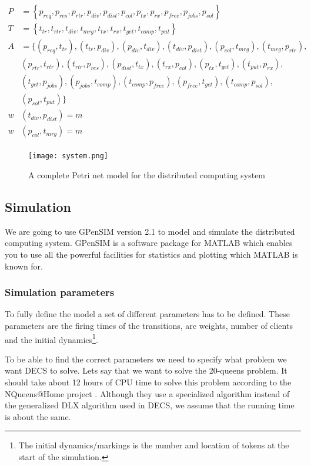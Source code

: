 \begin{align*} 
P &= \left\{p_{req}, p_{res}, p_{rtr}, p_{div}, p_{dist}, p_{col}, p_{tx}, p_{rx}, p_{free}, p_{jobs}, p_{sol}\right\} \\
T &= \left\{t_{tr}, t_{rtr}, t_{div}, t_{mrg}, t_{tx}, t_{rx}, t_{get}, t_{comp}, t_{put}\right\} \\
A &= \{(p_{req}, t_{tr}), (t_{tr}, p_{div}), (p_{div}, t_{div}), (t_{div}, p_{dist}), (p_{col}, t_{mrg}), (t_{mrg}, p_{rtr}), \\
&(p_{rtr}, t_{rtr}), (t_{rtr}, p_{res}), (p_{dist}, t_{tx}), (t_{rx}, p_{col}), (p_{tx}, t_{get}), (t_{put}, p_{rx}), \\
&(t_{get}, p_{jobs}), (p_{jobs}, t_{comp}), (t_{comp}, p_{free}), (p_{free}, t_{get}), (t_{comp}, p_{sol}), \\
&(p_{sol}, t_{put})\} \\
w&(t_{div}, p_{dist}) = m \\
w&(p_{col}, t_{mrg}) = m \\
\end{align*}

\begin{figure}[htbp]
	\centering 
	\texttt{[image: system.png]}
	\caption{A complete Petri net model for the distributed computing system}
	\label{fig:system}
\end{figure}


\subsection{Simulation}

We are going to use GPenSIM \cite{gpensim} version 2.1 to model and simulate the distributed computing system.
GPenSIM is a software package for MATLAB which enables you to use all the powerful facilities for statistics and plotting which MATLAB is known for.


\subsubsection{Simulation parameters}

To fully define the model a set of different parameters has to be defined.
These parameters are the firing times of the transitions, arc weights, number of clients and the initial dynamics\footnote{The initial dynamics/markings is the number and location of tokens at the start of the simulation.}.

To be able to find the correct parameters we need to specify what problem we want DECS to solve.
Lets say that we want to solve the 20-queens problem.
It should take about 12 hours of CPU time to solve this problem according to the NQueens@Home project \cite{nqueensathome}.
Although they use a specialized algorithm instead of the generalized DLX algorithm used in DECS, we assume that the running time is about the same.

